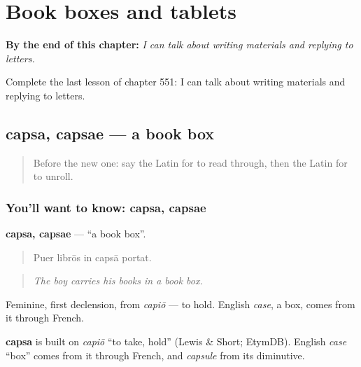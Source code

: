 
\chapter{Book boxes and tablets}
\label{ch:la-book-boxes-and-tablets}

\begin{chapteropening}
\textbf{By the end of this chapter:} \emph{I can talk about writing materials and replying to letters.}

Complete the last lesson of chapter 551: I can talk about writing materials and replying to letters.
\end{chapteropening}

\section[capsa, capsae]{capsa, capsae — a book box}

\label{lesson:LA-C551-capsa}



\begin{quote}
Before the new one: say the Latin for to read through, then the Latin for to unroll.
\end{quote}

\subsection*{You'll want to know: capsa, capsae}
\textbf{capsa, capsae} — \textquotedblleft{}a book box\textquotedblright{}.

\begin{quote}
Puer librōs in capsā portat.
\end{quote}

\begin{quote}
\emph{The boy carries his books in a book box.}
\end{quote}

Feminine, first declension, from \emph{capiō} — to hold. English \emph{case}, a box, comes from it through French.

\begin{cousinweb}
\textbf{capsa} is built on \emph{capiō} \textquotedblleft{}to take, hold\textquotedblright{} (Lewis \& Short; EtymDB). English \emph{case} \textquotedblleft{}box\textquotedblright{} comes from it through French, and \emph{capsule} from its diminutive.
\end{cousinweb}

